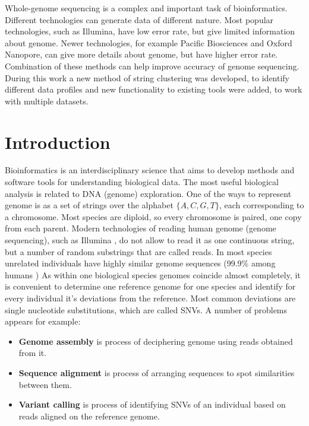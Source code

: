 \documentclass[a4paper, 12pt]{article}
\theoremstyle{definition}
\theoremstyle{definition}
\theoremstyle{remark}
\begin{document}
Whole-genome sequencing is a complex and important task of bioinformatics. 
Different technologies can generate data of different nature. 
Most popular technologies, such as Illumina, 
have low error rate, but give limited information about genome.
Newer technologies, for example Pacific Biosciences and Oxford Nanopore, 
can give more details about genome, but have higher error rate. 
Combination of these methods can help improve accuracy of genome sequencing. 
During this work a new method of string clustering was developed, 
to identify different data profiles and new functionality to existing tools were added,
to work with multiple datasets. 

\section{Introduction}
Bioinformatics is an interdisciplinary science that aims 
to develop methods and software tools 
for understanding biological data. 
The most useful biological analysis is related to DNA (genome) exploration. 
One of the ways to represent genome is as a set of strings over the alphabet $\{ A, C, G, T \}$, 
each corresponding to a chromosome.
Most species are diploid, so every chromosome is paired, one copy from each parent.  
Modern technologies of reading human genome (genome sequencing), 
such as Illumina \cite{goodwin2016coming},  
do not allow to read it as one 
continuous string, but a number of random substrings 
that are called reads. 
In most species unrelated individuals have highly similar genome sequences 
(99.9\% among humans \cite{NationalHumanGenome})  
As within one biological species genomes coincide almost completely, 
it is convenient to determine one reference genome for one species 
and identify for every individual it's deviations from the reference.
Most common deviations are single nucleotide substitutions, which are called SNVs.
A number of problems appears for example:
\begin{itemize}
    \item \textbf{Genome assembly} is process of  
    deciphering genome using reads obtained from it.
    
    \item \textbf{Sequence alignment} is process of 
    arranging sequences to spot similarities between them. 
    
    \item \textbf{Variant calling} is process of identifying 
    SNVs of an individual based on reads aligned on the reference genome.
\end{itemize}
\end{document}
